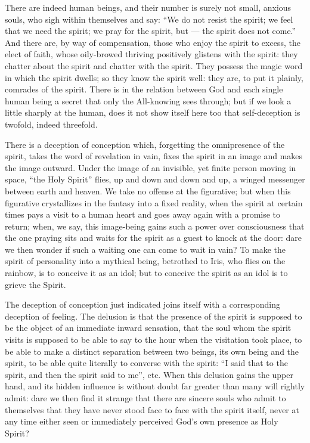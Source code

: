 \documentclass[12pt,a4paper,openany]{book}
\newcommand{\opage}[1]{\marginnote{\footnotesize\textit{[#1]}}}
\begin{document}
There are indeed human beings, and their number is surely not small,
anxious souls, who sigh within themselves and say: ``We do not
resist the spirit; we feel that we need the spirit; we
pray for the spirit, but --- the spirit does not come.'' And there
are, by way of compensation, those who enjoy the spirit to excess,
the elect of faith, whose oily-browed thriving positively glistens
with the spirit: they chatter about the spirit and chatter with the spirit.
They possess the magic word in which the spirit dwells; so they know
the spirit well: they are, to put it plainly, comrades of
the spirit. There is in the relation between God and each
single human being a secret that only the All-knowing sees through; but if we look a little sharply at the human,
does it not show itself here too that self-deception is
twofold, indeed threefold.

There is a deception of conception which, forgetting
the omnipresence of the spirit, takes the word of revelation
in vain, fixes the spirit in an image and makes the image
outward. Under the image of an invisible, yet
finite person moving in space, ``the
Holy Spirit'' flies, up and down and down and up, a winged messenger
between earth and heaven. We take no offense at the figurative;
but when this figurative crystallizes in the fantasy
into a fixed reality, when the spirit at certain times
pays a visit to a human heart and goes away again with
a promise to return; when, we say, this image-being
gains such a power over consciousness that the one praying
sits and waits for the spirit as a guest to knock at
the door: dare we then wonder if such a waiting one can
come to wait in vain? To make the spirit of personality
into a mythical being, betrothed to Iris, who flies on
the rainbow, is to conceive it as an idol; but to conceive
the spirit as an idol is to grieve the Spirit.

\setcounter{footnote}{0}%
\opage{60}The deception of conception just indicated joins itself with
a corresponding deception of feeling. %
The delusion is that the
presence of the spirit is supposed to be the object of an immediate inward
sensation, that the soul whom the spirit visits
is supposed to be able to say to the hour when the visitation
took place, to be able to make a distinct separation
between two beings, its own being and the spirit,
to be able quite literally to converse with the spirit: ``I said
that to the spirit, and then the spirit said to me'', etc.
When this delusion gains the upper hand, and its hidden
influence is without doubt far greater than many
will rightly admit: dare we then find it strange that there are
sincere souls who admit to themselves that they have never
stood face to face with the spirit itself, never
at any time either seen or immediately perceived
God's own presence as Holy Spirit?
\end{document}
